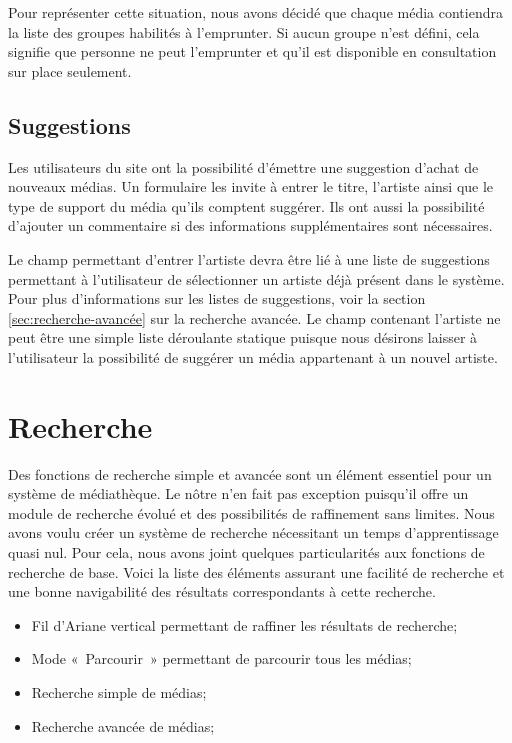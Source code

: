 \documentclass[letter, 11pt]{report}
\begin{document}
Pour représenter cette situation, nous avons décidé que chaque média contiendra la liste des groupes habilités à l'emprunter. Si aucun groupe n'est défini, cela signifie que personne ne peut l'emprunter et qu'il est disponible en consultation sur place seulement.

\subsection{Suggestions}
Les utilisateurs du site ont la possibilité d'émettre une suggestion d'achat de nouveaux médias. Un formulaire les invite à entrer le titre, l'artiste ainsi que le type de support du média qu'ils comptent suggérer. Ils ont aussi la possibilité d'ajouter un commentaire si des informations supplémentaires sont nécessaires.

Le champ permettant d'entrer l'artiste devra être lié à une liste de suggestions permettant à l'utilisateur de sélectionner un artiste déjà présent dans le système. Pour plus d'informations sur les listes de suggestions, voir la section \ref{sec:recherche-avancée} sur la recherche avancée. Le champ contenant l'artiste ne peut être une simple liste déroulante statique puisque nous désirons laisser à l'utilisateur la possibilité de suggérer un média appartenant à un nouvel artiste.

\section{Recherche}

Des fonctions de recherche simple et avancée sont un élément essentiel pour un système de médiathèque. Le nôtre n'en fait pas exception puisqu'il offre un module de recherche évolué et des possibilités de raffinement sans limites. Nous avons voulu créer un système de recherche nécessitant un temps d'apprentissage quasi nul. Pour cela, nous avons joint quelques particularités aux fonctions de recherche de base. Voici la liste des éléments assurant une facilité de recherche et une bonne navigabilité des résultats correspondants à cette recherche.

\begin{itemize}
	\item Fil d'Ariane vertical permettant de raffiner les résultats de recherche;
	\item Mode «~Parcourir~» permettant de parcourir tous les médias;
	\item Recherche simple de médias;
	\item Recherche avancée de médias;
\end{itemize}
\end{document}
